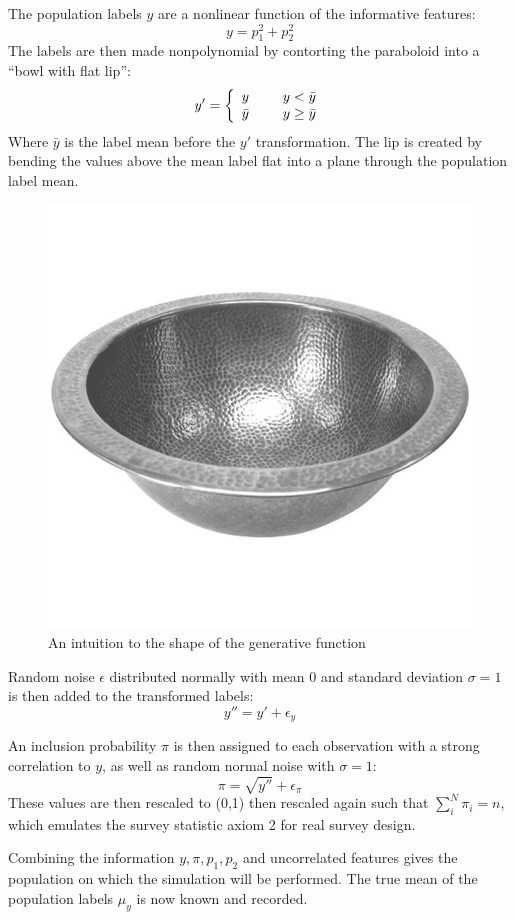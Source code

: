 \documentclass[12pt,twoside]{reedthesis}
\begin{document}
The population labels \(y\) are a nonlinear function of the informative
features: \[
y = p_1^2 + p_2^2
\] The labels are then made nonpolynomial by contorting the paraboloid
into a ``bowl with flat lip'': \[
y' = \left\{ \begin{array}{cc} 
                y & \hspace{5mm} y<\bar{y} \\
                \bar{y} & \hspace{5mm} y \geq \bar{y} \\
                \end{array} \right.
\] Where \(\bar{y}\) is the label mean before the \(y'\) transformation.
The lip is created by bending the values above the mean label flat into
a plane through the population label mean.
\begin{figure}
\includegraphics[width=0.7\linewidth]{figure/bowl} \caption{An intuition to the shape of the generative function}\label{fig:unnamed-chunk-2}
\end{figure}
Random noise \(\epsilon\) distributed normally with mean \(0\) and
standard deviation \(\sigma = 1\) is then added to the transformed
labels: \[
y'' = y' + \epsilon_y
\]

An inclusion probability \(\pi\) is then assigned to each observation
with a strong correlation to \(y\), as well as random normal noise with
\(\sigma = 1\): \[
\pi = \sqrt{y''} + \epsilon_\pi
\] These values are then rescaled to (0,1) then rescaled again such that
\(\sum_i^N \pi_i = n\), which emulates the survey statistic axiom 2 for
real survey design.

Combining the information \(y,\pi, p_1, p_2\) and uncorrelated features
gives the population on which the simulation will be performed. The true
mean of the population labels \(\mu_y\) is now known and recorded.
\end{document}
